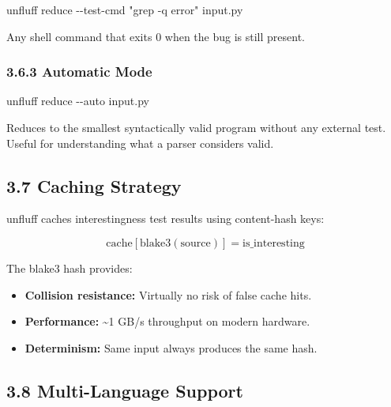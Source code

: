 \documentclass[
  letterpaper,
]{article}
\newenvironment{Shaded}{\begin{snugshade}}{\end{snugshade}}
\newcommand{\AttributeTok}[1]{\textcolor[rgb]{0.40,0.45,0.13}{#1}}
\newcommand{\ExtensionTok}[1]{\textcolor[rgb]{0.00,0.23,0.31}{#1}}
\newcommand{\NormalTok}[1]{\textcolor[rgb]{0.00,0.23,0.31}{#1}}
\newcommand{\StringTok}[1]{\textcolor[rgb]{0.13,0.47,0.30}{#1}}
\providecommand{\tightlist}{%
  \setlength{\itemsep}{0pt}\setlength{\parskip}{0pt}}
\begin{document}
\begin{Shaded}
\begin{Highlighting}[]
\ExtensionTok{unfluff}\NormalTok{ reduce }\AttributeTok{{-}{-}test{-}cmd} \StringTok{"grep {-}q \textquotesingle{}error\textquotesingle{}"}\NormalTok{ input.py}
\end{Highlighting}
\end{Shaded}

Any shell command that exits 0 when the bug is still present.

\subsubsection{3.6.3 Automatic Mode}\label{automatic-mode}

\begin{Shaded}
\begin{Highlighting}[]
\ExtensionTok{unfluff}\NormalTok{ reduce }\AttributeTok{{-}{-}auto}\NormalTok{ input.py}
\end{Highlighting}
\end{Shaded}

Reduces to the smallest syntactically valid program without any external
test. Useful for understanding what a parser considers valid.

\subsection{3.7 Caching Strategy}\label{caching-strategy}

unfluff caches interestingness test results using content-hash keys:

\[
\text{cache}[\text{blake3}(\text{source})] = \text{is\_interesting}
\]

The blake3 hash provides:

\begin{itemize}
\tightlist
\item
  \textbf{Collision resistance:} Virtually no risk of false cache hits.
\item
  \textbf{Performance:} \textasciitilde1 GB/s throughput on modern
  hardware.
\item
  \textbf{Determinism:} Same input always produces the same hash.
\end{itemize}

\subsection{3.8 Multi-Language Support}\label{multi-language-support}
\end{document}
